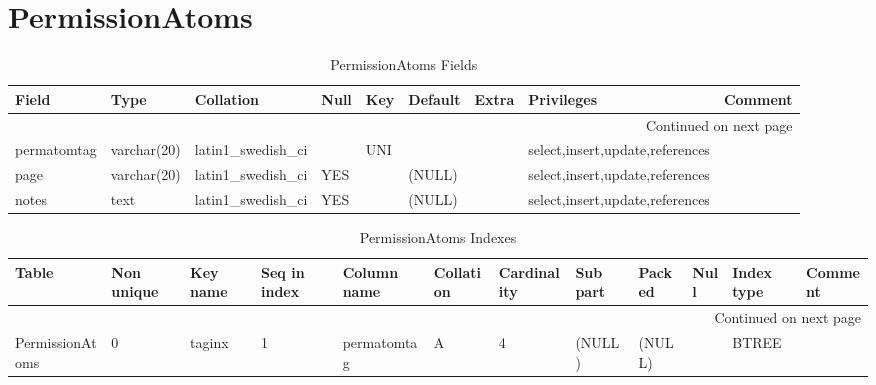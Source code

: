 \documentclass[tablesignature,landscape]{scrartcl}
\begin{document}
\section{PermissionAtoms}
\label{sec-13}


\begin{longtable}{|l|l|l|l|l|l|l|l|l|}
\caption{PermissionAtoms Fields} \label{tbl:permissionatomsfields}\\
\hline
 Field        &  Type         &  Collation                &  Null  &  Key  &  Default  &  Extra              &  Privileges                       &  Comment \\
\hline
\endhead
\hline\multicolumn{9}{r}{Continued on next page}\
\endfoot
\endlastfoot
\hline
 permatomid   &  int(11)      &  NULL                     &        &  PRI  &  (NULL)   &  auto\_{}increment  &  select,insert,update,references  &           \\
 permatomtag  &  varchar(20)  &  latin1\_{}swedish\_{}ci  &        &  UNI  &           &                     &  select,insert,update,references  &           \\
 page         &  varchar(20)  &  latin1\_{}swedish\_{}ci  &  YES   &       &  (NULL)   &                     &  select,insert,update,references  &           \\
 notes        &  text         &  latin1\_{}swedish\_{}ci  &  YES   &       &  (NULL)   &                     &  select,insert,update,references  &           \\
\hline
\end{longtable}


\begin{longtable}{|l|l|l|l|l|l|l|l|l|l|l|l|}
\caption{PermissionAtoms Indexes} \label{tbl:permissionatomsindexes}\\
\hline
 Table            &  Non unique  &  Key name  &  Seq in index  &  Column name  &  Collation  &  Cardinality  &  Sub part  &  Packed  &  Null  &  Index type  &  Comment \\
\hline
\endhead
\hline\multicolumn{12}{r}{Continued on next page}\
\endfoot
\endlastfoot
\hline
 PermissionAtoms  &           0  &  PRIMARY   &             1  &  permatomid   &  A          &            4  &  (NULL)    &  (NULL)  &        &  BTREE       &           \\
 PermissionAtoms  &           0  &  taginx    &             1  &  permatomtag  &  A          &            4  &  (NULL)    &  (NULL)  &        &  BTREE       &           \\
\hline
\end{longtable}
\end{document}
